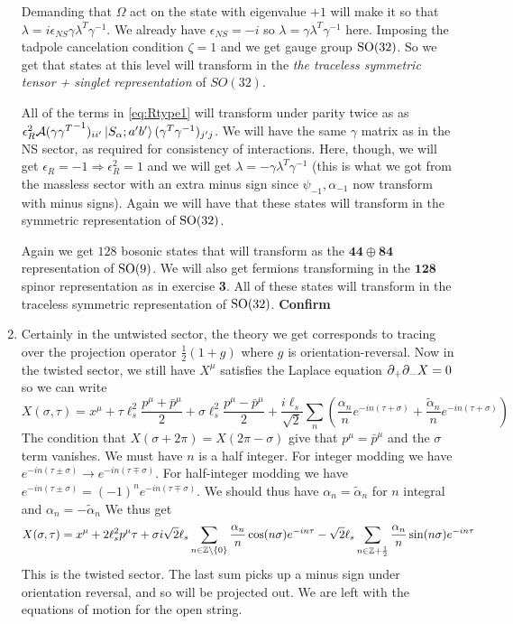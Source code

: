 \documentclass[11pt, class=article, crop=false]{standalone}
\begin{document}
\begin{enumerate}
	Demanding that $\Omega$ act on the state with eigenvalue $+1$ will make it so that $\lambda = i \epsilon_{NS} \gamma \lambda^{T} \gamma^{-1}$. We already have $\epsilon_{NS} = -i$ so $\lambda = \gamma \lambda^T \gamma^{-1}$ here. %
	Imposing the tadpole cancelation condition $\zeta = 1$ and we get gauge group $\mathrm{SO}(32)$. So we get that states at this level will transform in the  \emph{the traceless symmetric tensor + singlet representation} of $SO(32)$.
	
	All of the terms in \eqref{eq:Rtype1} will transform under parity twice as as $\epsilon_R^2 \mathcal A (\gamma {\gamma^T}^{-1})_{ii'} \ket{S_\alpha; a'b'} (\gamma^T {\gamma}^{-1})_{j'j}$. We will have the same $\gamma$ matrix as in the NS sector, as required for consistency of interactions. Here, though, we will get $\epsilon_R = -1 \Rightarrow \epsilon_R^2 = 1$ and we will get $\lambda = -\gamma \lambda^T \gamma^{-1}$ (this is what we got from the massless sector with an extra minus sign since $\psi_{-1}, \alpha_{-1}$ now transform with minus signs). Again we will have that these states will transform in the symmetric representation of $\mathrm{SO}(32)$. 

	Again we get $128$ bosonic states that will transform as the $\mathbf{44} \oplus \mathbf{84}$ representation of $\mathrm{SO}(9)$. We will also get fermions transforming in the $\mathbf{128}$ spinor representation as in exercise \textbf{3}. 
	All of these states will transform in the traceless symmetric representation of $\mathrm{SO}(32)$. \textbf{Confirm}
	
	
	\item Certainly in the untwisted sector, the theory we get corresponds to tracing over the projection operator $\frac12 (1 + g)$ where $g$ is orientation-reversal. Now in the twisted sector, we still have $X^\mu$ satisfies the Laplace equation $\partial_+ \partial_- X = 0$ so we can write
	\[
		X(\sigma, \tau) = x^\mu + \tau \ell_s^2 \frac{p^\mu + \bar p^\mu}{2} + \sigma \ell_s^2 \frac{p^\mu - \bar p^\mu}{2} + \frac{i \ell_s}{\sqrt 2} \sum_{n} \left( \frac{\alpha_n}{n} e^{-i n (\tau  + \sigma)} + \frac{\tilde \alpha_n}{n} e^{-i n (\tau  + \sigma)} \right)
	\]
	The condition that $X(\sigma + 2\pi) = X(2\pi-\sigma)$ give that $p^\mu = \bar p^\mu$ and the $\sigma$ term vanishes. We must have $n$ is a half integer. For integer modding we have $e^{-i n (\tau \pm \sigma)} \to e^{-i n (\tau \mp \sigma)}$. For half-integer modding we have $e^{-i n (\tau \pm \sigma)} = (-1)^n e^{-i n (\tau \mp \sigma)}$. We should thus have $\alpha_n = \tilde \alpha_n$ for $n$ integral and $\alpha_{n} = -\tilde \alpha_{n}$ We thus get
	\[
			X(\sigma, \tau) = x^\mu + 2 \ell_s^2 p^\mu \tau + \sigma  i \sqrt 2\ell_s \sum_{n \in \mathbb{Z} \setminus \{0\}} \frac{\alpha_n}{n} \cos(n \sigma) e^{- i n \tau}  - \sqrt{2} \ell_s \sum_{n \in \mathbb{Z} + \frac12} \frac{\alpha_n}{n} \sin(n \sigma) e^{-i n \tau}
	\]
	This is the twisted sector. The last sum picks up a minus sign under orientation reversal, and so will be projected out. We are left with the equations of motion for the open string.
	

\end{enumerate}
\end{document}
